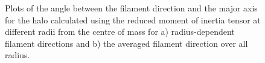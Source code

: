 \documentclass[journal]{IEEEtran}
\begin{document}
\begin{figure}[t]
\label{fig:angleplots}
	\caption{Plots of the angle between the filament direction and the major axis for the halo calculated using the reduced moment of inertia tensor at different radii from the centre of mass for a) radius-dependent filament directions and b) the averaged filament direction over all radius.}
\end{figure}
\end{document}
